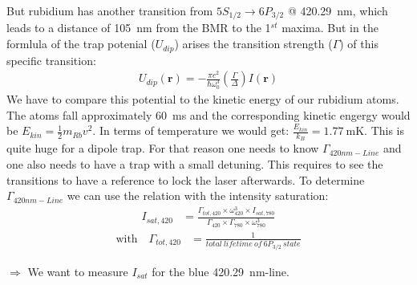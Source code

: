 But rubidium has another transition from \(5S_{1/2} \rightarrow 6P_{3/2}\) @
\SI{420.29}{\nano\meter}, which leads to a distance of \SI{105}{\nano\meter} from
the BMR to the 1\(^{st}\) maxima. But in the formlula \citep{grimm} of the trap potenial (\(U_{dip}\))
arises the transition strength (\(\Gamma \)) of this specific transition:
\bigskip
\begin{align}
    U_{dip}(\mathbf{r})=-\frac{\pi c^2}{\hbar\omega_0^3} \left( \frac{\Gamma}{\Delta} \right) I(\mathbf{r})
\end{align}
\bigskip
We have to compare this potential to the kinetic energy of our rubidium atoms. The atoms fall approximately
\SI{60}{\milli\second} and the corresponding kinetic engergy would be \(E_{kin} = \frac{1}{2} m_{Rb} v^2\).
In terms of temperature we would get: \(\frac{E_{kin}}{k_B} = \SI{1.77}{\milli\kelvin}\). This is quite huge
for a dipole trap. For that reason one needs to know \(\Gamma_{420nm-Line}\) and one also needs to have a trap
with a small detuning. This requires to see the transitions to have a reference to lock the laser afterwards.
\bigskip
To determine \(\Gamma_{420nm-Line}\) we can use the relation with the intensity saturation:
\begin{align}
    I_{sat,420} &= \frac{\Gamma_{tot,420}\times\omega_{420}^3\times I_{sat,780}}{\Gamma_{420}\times\Gamma_{780}\times\omega_{780}^3}
\end{align}
\begin{align*}
    \text{with~~~} \Gamma_{tot,420} &= \frac{1}{total~lifetime~of~6P_{3/2}~state}
\end{align*}
\medskip

\(\Rightarrow \) We want to measure \(I_{sat}\) for the blue \SI{420.29}{\nano\meter}-line. 

